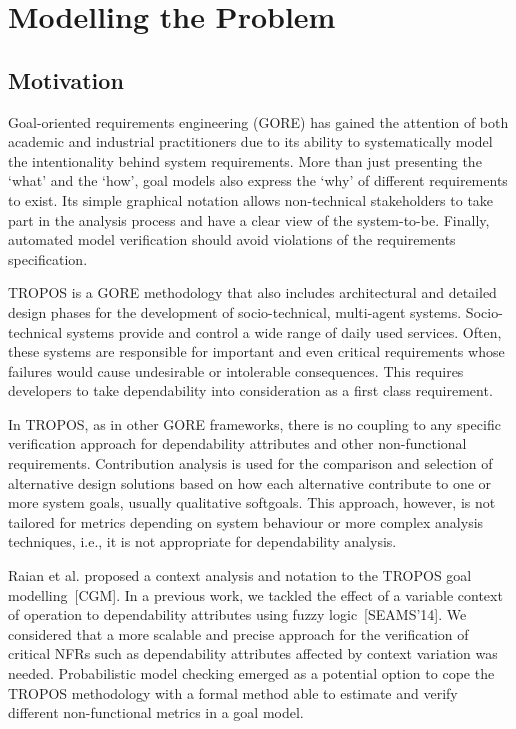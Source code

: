 \chapter{Modelling the Problem}\label{ch:motivation}

\section{Motivation}


Goal-oriented requirements engineering (GORE) has gained the attention of both academic and industrial practitioners due to its ability to systematically model the intentionality behind system requirements. More than just presenting the `what' and the `how', goal models also express the `why' of different requirements to exist. Its simple graphical notation allows non-technical stakeholders to take part in the analysis process and have a clear view of the system-to-be. Finally, automated model verification should avoid violations of the requirements specification.

TROPOS is a GORE methodology that also includes architectural and  detailed design phases for the development of socio-technical, multi-agent systems. Socio-technical systems provide and control a wide range of daily used services. Often, these systems are responsible for important and even critical requirements whose failures would cause undesirable or intolerable consequences. This requires developers to take dependability into consideration as a first class requirement.

In TROPOS, as in other GORE frameworks, there is no coupling to any specific verification approach for dependability attributes and other non-functional requirements. Contribution analysis is used for the comparison and selection of alternative design solutions based on how each alternative contribute to one or more system goals, usually qualitative softgoals. This approach, however, is not tailored for metrics depending on system behaviour or more complex analysis techniques, i.e., it is not appropriate for dependability analysis. 


Raian et al. proposed a context analysis and notation to the TROPOS goal modelling~[CGM]. In a previous work, we tackled the effect of a variable context of operation to dependability attributes using fuzzy logic~[SEAMS'14]. We considered that a more scalable and precise approach for the verification of critical NFRs such as dependability attributes affected by context variation was needed. Probabilistic model checking emerged as a potential option to cope the TROPOS methodology with a formal method able to estimate and verify different non-functional metrics in a goal model.

